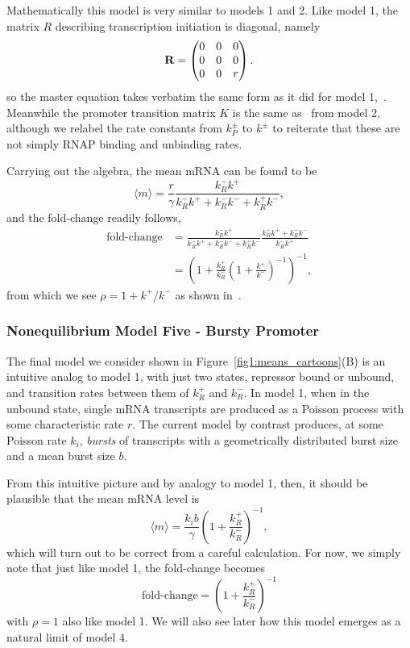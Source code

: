 Mathematically this model is very similar to models 1 and 2. Like model 1, the
matrix $R$ describing transcription initiation is diagonal, namely
\begin{equation}
\mathbf{R} = \begin{pmatrix}
                0 & 0 & 0 \\ 0 & 0 & 0 \\ 0 & 0 & r
        \end{pmatrix}.
\end{equation}
so the master equation takes verbatim the same form as it did for model
1,~. Meanwhile the promoter transition matrix $K$ is the
same as~ from model 2, although we relabel the
rate constants from $k_P^\pm$ to $k^\pm$ to reiterate that these are not simply
RNAP binding and unbinding rates.

Carrying out the algebra, the mean mRNA can be found to be
\begin{equation}
\langle m\rangle = \frac{r}{\gamma}
\frac{k_R^- k^+}
{k_R^- k^+ + k_R^- k^- + k_R^+ k^-},
\end{equation}
and the fold-change readily follows,
\begin{align}
\text{fold-change}
&=      \frac{k_R^- k^+}{k_R^- k^+ + k_R^- k^- + k_R^+ k^-}
        \frac{k_R^- k^+ + k_R^- k^-}{k_R^- k^+}
\\
&=      \left(1 + \frac{k_R^+}{k_R^-}
                \left(1 + \frac{k^+}{k^-}\right)^{-1}
        \right)^{-1},
\end{align}
from which we see $\rho = 1 + k^+/k^-$ as shown in~.

\subsubsection{Nonequilibrium Model Five - Bursty Promoter}
The final model we consider shown in Figure~\ref{fig1:means_cartoons}(B) 
is an intuitive analog to model 1, with just two states, repressor
bound or unbound, and transition rates between them of $k_R^+$ and $k_R^-$. In
model 1, when in the unbound state, single mRNA transcripts are produced as a
Poisson process with some characteristic rate $r$. The current model by contrast
produces, at some Poisson rate $k_i$, \textit{bursts} of transcripts with a
geometrically distributed burst size and a mean burst size $b$.

From this intuitive picture and by analogy to model 1, then, it should be
plausible that the mean mRNA level is
\begin{equation}
\langle m\rangle = \frac{k_i b}{\gamma}
        \left(1 + \frac{k_R^+}{k_R^-}\right)^{-1},
\end{equation}
which will turn out to be correct from a careful calculation. For now, we simply
note that just like model 1, the fold-change becomes
\begin{equation}
\text{fold-change} = \left(1 + \frac{k_R^+}{k_R^-}\right)^{-1}
\end{equation}
with $\rho=1$ also like model 1.
We will also see later how this model emerges as a natural limit of model 4.

